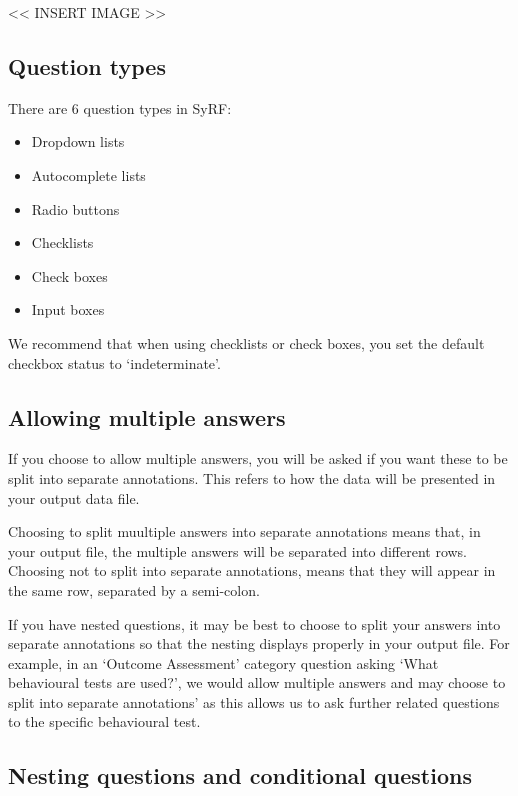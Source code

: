 \documentclass[
]{book}
\providecommand{\tightlist}{%
  \setlength{\itemsep}{0pt}\setlength{\parskip}{0pt}}
\begin{document}
\textless{}\textless{} INSERT IMAGE \textgreater{}\textgreater{}

\hypertarget{question-types}{%
\subsection{Question types}\label{question-types}}

There are 6 question types in SyRF:

\begin{itemize}
\tightlist
\item
  Dropdown lists
\item
  Autocomplete lists
\item
  Radio buttons
\item
  Checklists
\item
  Check boxes
\item
  Input boxes
\end{itemize}

We recommend that when using checklists or check boxes, you set the default checkbox status to `indeterminate'.

\hypertarget{allowing-multiple-answers}{%
\subsection{Allowing multiple answers}\label{allowing-multiple-answers}}

If you choose to allow multiple answers, you will be asked if you want these to be split into separate annotations. This refers to how the data will be presented in your output data file.

Choosing to split muultiple answers into separate annotations means that, in your output file, the multiple answers will be separated into different rows. Choosing not to split into separate annotations, means that they will appear in the same row, separated by a semi-colon.

If you have nested questions, it may be best to choose to split your answers into separate annotations so that the nesting displays properly in your output file. For example, in an `Outcome Assessment' category question asking `What behavioural tests are used?', we would allow multiple answers and may choose to split into separate annotations' as this allows us to ask further related questions to the specific behavioural test.

\hypertarget{nesting-questions-and-conditional-questions}{%
\subsection{Nesting questions and conditional questions}\label{nesting-questions-and-conditional-questions}}
\end{document}
